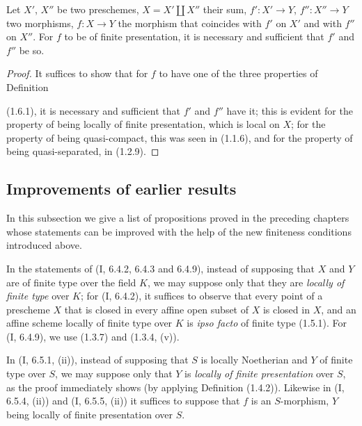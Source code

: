 \begin{proposition}[1.6.5]
\label{IV.1.6.5}
Let $X'$, $X''$ be two preschemes, $X=X'\amalg X''$ their sum,
$f':X'\to Y$, $f'':X''\to Y$ two morphisms, $f:X\to Y$ the morphism that
coincides with $f'$ on $X'$ and with $f''$ on $X''$. For $f$ to be of
finite presentation, it is necessary and sufficient that $f'$ and $f''$ be so.
\end{proposition}

\par\medskip\noindent
\begin{proof}
It suffices to show that for $f$ to have one of the three properties of
Definition


(1.6.1), it is necessary and sufficient that $f'$ and $f''$ have it; this is
evident for the property of being locally of finite presentation, which is
local on $X$; for the property of being quasi-compact, this was seen in
(1.1.6), and for the property of being quasi-separated, in (1.2.9).
\end{proof}


\subsection{Improvements of earlier results}
\label{subsection:IV.1.7}

In this subsection we give a list of propositions proved in the preceding
chapters whose statements can be improved with the help of the new
finiteness conditions introduced above.

\begin{env}[1.7.1]
\label{IV.1.7.1}
In the statements of (I, 6.4.2, 6.4.3 and 6.4.9), instead of supposing
that $X$ and $Y$ are of finite type over the field $K$, we may suppose only
that they are \emph{locally of finite type} over $K$; for (I, 6.4.2), it
suffices to observe that every point of a prescheme $X$ that is closed in
every affine open subset of $X$ is closed in $X$, and an affine scheme locally
of finite type over $K$ is \emph{ipso facto} of finite type (1.5.1). For
(I, 6.4.9), we use (1.3.7) and (1.3.4, (v)).
\end{env}

\begin{env}[1.7.2]
\label{IV.1.7.2}
In (I, 6.5.1, (ii)), instead of supposing that $S$ is locally
Noetherian and $Y$ of finite type over $S$, we may suppose only that $Y$ is
\emph{locally of finite presentation} over $S$, as the proof immediately
shows (by applying Definition (1.4.2)). Likewise in (I, 6.5.4,
(ii)) and (I, 6.5.5, (ii)) it suffices to suppose that $f$ is an
$S$-morphism, $Y$ being locally of finite presentation over $S$.
\end{env}

